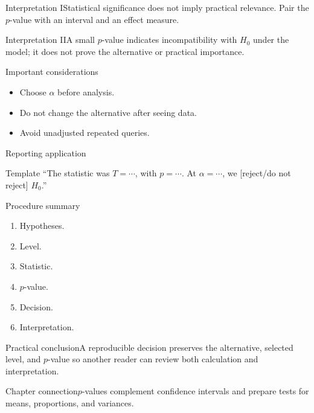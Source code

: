 \documentclass[10pt,aspectratio=169]{beamer}
\begin{document}
\begin{frame}{Interpretation I}\small Statistical significance does not imply practical relevance. Pair the $p$-value with an interval and an effect measure.\end{frame}
\begin{frame}{Interpretation II}\small A small $p$-value indicates incompatibility with $H_0$ under the model; it does not prove the alternative or practical importance.\end{frame}
\begin{frame}{Important considerations}\small\begin{itemize}\item Choose $\alpha$ before analysis.\item Do not change the alternative after seeing data.\item Avoid unadjusted repeated queries.\end{itemize}\end{frame}
\begin{frame}{Reporting application}\small\begin{block}{Template} ``The statistic was $T=\cdots$, with $p=\cdots$. At $\alpha=\cdots$, we [reject/do not reject] $H_0$.''\end{block}\end{frame}
\begin{frame}{Procedure summary}\small\begin{enumerate}\item Hypotheses.\item Level.\item Statistic.\item $p$-value.\item Decision.\item Interpretation.\end{enumerate}\end{frame}
\begin{frame}{Practical conclusion}\small A reproducible decision preserves the alternative, selected level, and $p$-value so another reader can review both calculation and interpretation.\end{frame}
\begin{frame}{Chapter connection}\small $p$-values complement confidence intervals and prepare tests for means, proportions, and variances.\end{frame}
\end{document}
